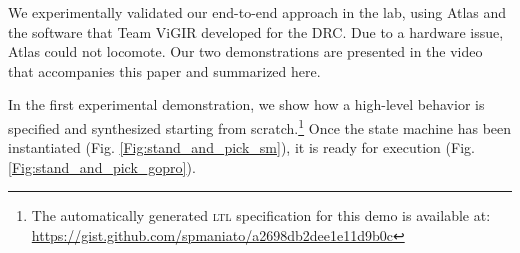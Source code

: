 
We experimentally validated our end-to-end approach in the lab, using Atlas and the software that Team ViGIR developed for the DRC.
Due to a hardware issue, Atlas could not locomote.
Our two demonstrations are presented in the video that accompanies this paper and summarized here.

In the first experimental demonstration, we show how a high-level behavior is specified and synthesized starting from scratch.\footnote{The automatically generated \textsc{ltl} specification for this demo is available at: \scriptsize{\url{https://gist.github.com/spmaniato/a2698db2dee1e11d9b0c}}}
Once the state machine has been instantiated (Fig. \ref{Fig:stand_and_pick_sm}), it is ready for execution (Fig. \ref{Fig:stand_and_pick_gopro}).

